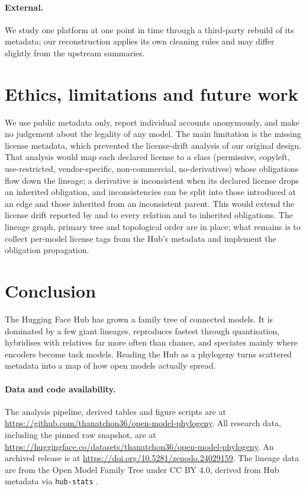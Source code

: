 \documentclass[11pt]{article}
\begin{document}
\paragraph{External.} We study one platform at one point in time through a third-party rebuild of its metadata; our reconstruction applies its own cleaning rules and may differ slightly from the upstream summaries.

\section{Ethics, limitations and future work}\label{sec:ethics}
We use public metadata only, report individual accounts anonymously, and make no judgement about the legality of any model. The main limitation is the missing license metadata, which prevented the license-drift analysis of our original design. That analysis would map each declared license to a class (permissive, copyleft, use-restricted, vendor-specific, non-commercial, no-derivatives) whose obligations flow down the lineage; a derivative is inconsistent when its declared license drops an inherited obligation, and inconsistencies can be split into those introduced at an edge and those inherited from an inconsistent parent. This would extend the license drift reported by \citet{laufer2025} and \citet{jewitt2025} to every relation and to inherited obligations. The lineage graph, primary tree and topological order are in place; what remains is to collect per-model license tags from the Hub's metadata and implement the obligation propagation.

\section{Conclusion}
The Hugging Face Hub has grown a family tree of \nConnected connected models. It is dominated by a few giant lineages, reproduces fastest through quantisation, hybridises with relatives far more often than chance, and speciates mainly where encoders become task models. Reading the Hub as a phylogeny turns scattered metadata into a map of how open models actually spread.

\paragraph{Data and code availability.} The analysis pipeline, derived tables and figure scripts are at \url{https://github.com/thanatchon36/open-model-phylogeny}. All research data, including the pinned raw snapshot, are at \url{https://huggingface.co/datasets/thanatchon36/open-model-phylogeny}. An archived release is at \url{https://doi.org/10.5281/zenodo.24029159}. The lineage data are from the Open Model Family Tree \citep{h9tec2026} under CC BY 4.0, derived from Hub metadata via \texttt{hub-stats} \citep{hubstats}.
\end{document}
